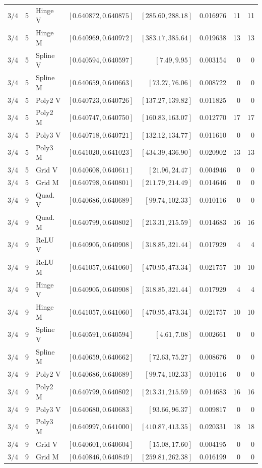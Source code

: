 \begin{longtable}{rrlrrrrr}
$3/4$ & 5 & Hinge V & $[0.640872,0.640875]$ & $[285.60,288.18]$ & 0.016976 & 11 & 11\\
$3/4$ & 5 & Hinge M & $[0.640969,0.640972]$ & $[383.17,385.64]$ & 0.019638 & 13 & 13\\
$3/4$ & 5 & Spline V & $[0.640594,0.640597]$ & $[7.49,9.95]$ & 0.003154 & 0 & 0\\
$3/4$ & 5 & Spline M & $[0.640659,0.640663]$ & $[73.27,76.06]$ & 0.008722 & 0 & 0\\
$3/4$ & 5 & Poly2 V & $[0.640723,0.640726]$ & $[137.27,139.82]$ & 0.011825 & 0 & 0\\
$3/4$ & 5 & Poly2 M & $[0.640747,0.640750]$ & $[160.83,163.07]$ & 0.012770 & 17 & 17\\
$3/4$ & 5 & Poly3 V & $[0.640718,0.640721]$ & $[132.12,134.77]$ & 0.011610 & 0 & 0\\
$3/4$ & 5 & Poly3 M & $[0.641020,0.641023]$ & $[434.39,436.90]$ & 0.020902 & 13 & 13\\
$3/4$ & 5 & Grid V & $[0.640608,0.640611]$ & $[21.96,24.47]$ & 0.004946 & 0 & 0\\
$3/4$ & 5 & Grid M & $[0.640798,0.640801]$ & $[211.79,214.49]$ & 0.014646 & 0 & 0\\
$3/4$ & 9 & Quad. V & $[0.640686,0.640689]$ & $[99.74,102.33]$ & 0.010116 & 0 & 0\\
$3/4$ & 9 & Quad. M & $[0.640799,0.640802]$ & $[213.31,215.59]$ & 0.014683 & 16 & 16\\
$3/4$ & 9 & ReLU V & $[0.640905,0.640908]$ & $[318.85,321.44]$ & 0.017929 & 4 & 4\\
$3/4$ & 9 & ReLU M & $[0.641057,0.641060]$ & $[470.95,473.34]$ & 0.021757 & 10 & 10\\
$3/4$ & 9 & Hinge V & $[0.640905,0.640908]$ & $[318.85,321.44]$ & 0.017929 & 4 & 4\\
$3/4$ & 9 & Hinge M & $[0.641057,0.641060]$ & $[470.95,473.34]$ & 0.021757 & 10 & 10\\
$3/4$ & 9 & Spline V & $[0.640591,0.640594]$ & $[4.61,7.08]$ & 0.002661 & 0 & 0\\
$3/4$ & 9 & Spline M & $[0.640659,0.640662]$ & $[72.63,75.27]$ & 0.008676 & 0 & 0\\
$3/4$ & 9 & Poly2 V & $[0.640686,0.640689]$ & $[99.74,102.33]$ & 0.010116 & 0 & 0\\
$3/4$ & 9 & Poly2 M & $[0.640799,0.640802]$ & $[213.31,215.59]$ & 0.014683 & 16 & 16\\
$3/4$ & 9 & Poly3 V & $[0.640680,0.640683]$ & $[93.66,96.37]$ & 0.009817 & 0 & 0\\
$3/4$ & 9 & Poly3 M & $[0.640997,0.641000]$ & $[410.87,413.35]$ & 0.020331 & 18 & 18\\
$3/4$ & 9 & Grid V & $[0.640601,0.640604]$ & $[15.08,17.60]$ & 0.004195 & 0 & 0\\
$3/4$ & 9 & Grid M & $[0.640846,0.640849]$ & $[259.81,262.38]$ & 0.016199 & 0 & 0\\
\end{longtable}
\endgroup


